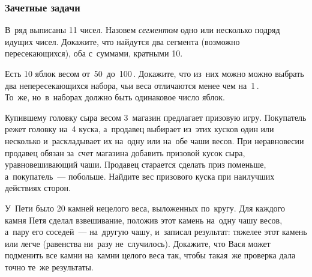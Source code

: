 \subsubsection*{Зачетные задачи}

\begin{problems}

\item
В~ряд выписаны 11 чисел.
Назовем \emph{сегментом} одно или несколько подряд идущих чисел.
Докажите, что найдутся два сегмента (возможно пересекающихся), оба с~суммами,
кратными 10.

\item
\subproblem
Есть 10 яблок весом от~50\, до~100\,.
Докажите, что из~них можно можно выбрать два непересекающихся набора, чьи веса
отличаются менее чем на~1\,.
\\
\subproblem
То~же, но~в~наборах должно быть одинаковое число яблок.

\item
Купившему головку сыра весом 3\, магазин предлагает призовую игру.
Покупатель режет головку на~4 куска, а~продавец выбирает из~этих кусков один
или несколько и~раскладывает их на~одну или на~обе чаши весов.
При неравновесии продавец обязан за~счет магазина добавить призовой кусок сыра,
уравновешивающий чаши.
Продавец старается сделать приз поменьше, а~покупатель~--- побольше.
Найдите вес призового куска при наилучших действиях сторон.

У~Пети было 20 камней нецелого веса, выложенных по~кругу.
Для каждого камня Петя сделал взвешивание, положив этот камень на~одну чашу
весов, а~пару его соседей~--- на~другую чашу, и~записал результат: тяжелее этот
камень или легче (равенства ни~разу не~случилось).
Докажите, что Вася может подменить все камни на~камни целого веса так, чтобы
такая~же проверка дала точно те~же результаты.

\end{problems}


